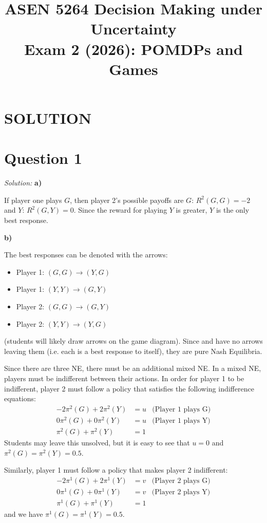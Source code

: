 \documentclass{article}
\title{ASEN 5264 Decision Making under Uncertainty\\
       Exam 2 (2026): POMDPs and Games}
\author{}
\theoremstyle{definition}
\newenvironment{solution}{\noindent\textit{Solution:}}{}
\begin{document}
\maketitle

\section*{SOLUTION}

\newpage
\section*{Question 1}
\begin{solution}
\textbf{a)}

If player one plays $G$, then player 2's possible payoffs are $G$: $R^2(G, G) = -2$ and $Y$: $R^2(G, Y) = 0$. Since the reward for playing $Y$ is greater, $Y$ is the only best response.

\textbf{b)}

The best responses can be denoted with the arrows:
\begin{itemize}
    \item Player 1: $(G,G) \rightarrow (Y,G)$
    \item Player 1: $(Y,Y) \rightarrow (G,Y)$
    \item Player 2: $(G,G) \rightarrow (G,Y)$
    \item Player 2: $(Y,Y) \rightarrow (Y,G)$
\end{itemize}
(students will likely draw arrows on the game diagram). Since  and  have no arrows leaving them (i.e. each is a best response to itself), they are pure Nash Equilibria.

Since there are three NE, there must be an additional mixed NE. In a mixed NE, players must be indifferent between their actions. In order for player 1 to be indifferent, player 2 must follow a policy that satisfies the following indifference equations:
\begin{align*}
    -2\pi^2(G) + 2 \pi^2(Y) &= u &\text{(Player 1 plays G)}\\
    0\pi^2(G) + 0\pi^2(Y) &= u &\text{(Player 1 plays Y)}\\
    \pi^2(G) + \pi^2(Y) &= 1 &
\end{align*}
Students may leave this unsolved, but it is easy to see that $u=0$ and $\boxed{\pi^2(G) = \pi^2(Y) = 0.5}$.

Similarly, player 1 must follow a policy that makes player 2 indifferent:
\begin{align*}
    -2\pi^1(G) + 2 \pi^1(Y) &= v &\text{(Player 2 plays G)}\\
    0 \pi^1(G) + 0 \pi^1(Y) &= v & \text{(Player 2 plays Y)}\\
    \pi^1(G) + \pi^1(Y) &= 1
\end{align*}
and we have $\boxed{\pi^1(G) = \pi^1(Y) = 0.5}$.


\end{solution}
\end{document}

